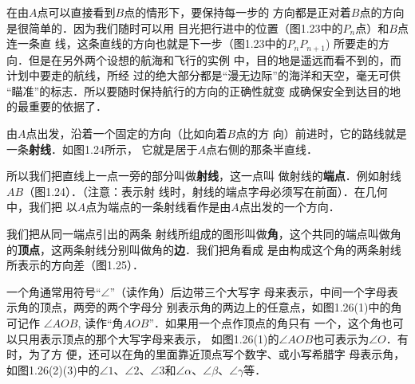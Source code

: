 在由$A$点可以直接看到$B$点的情形下，要保持每一步的
方向都是正对着$B$点的方向是很简单的．因为我们随时可以用
目光把行进中的位置（图1.23中的$P_n$点）和$B$点连一条直
线，这条直线的方向也就是下一步（图1.23中的$P_nP_{n+1}$)
所要走的方向．但是在另外两个设想的航海和飞行的实例
中，目的地是遥远而看不到的，而计划中要走的航线，所经
过的绝大部分都是“漫无边际”的海洋和天空，毫无可供
“瞄准”的标志．所以要随时保持航行的方向的正确性就变
成确保安全到达目的地的最重要的依据了．

由$A$点出发，沿着一个固定的方向（比如向着$B$点的方
向）前进时，它的路线就是一条\textbf{射线}．如图1.24所示，
它就是居于$A$点右侧的那条半直线．
\begin{figure}[htp]\centering
    \begin{minipage}[t]{0.48\textwidth}
    \centering
{}
    \caption{}
    \end{minipage}
    \begin{minipage}[t]{0.48\textwidth}
    \centering
    \caption{}
    \end{minipage}
    \end{figure}

所以我们把直线上一点一旁的部分叫做\textbf{射线}，这一点叫
做射线的\textbf{端点}．例如射线$AB$（图1.24）．（注意：表示射
线时，射线的端点字母必须写在前面）．在几何中，我们把
以$A$点为端点的一条射线看作是由$A$点出发的一个方向．

我们把从同一端点引出的两条
射线所组成的图形叫做\textbf{角}，这个共同的端点叫做角的\textbf{顶点}，这两条射线分别叫做角的\textbf{边}．我们把角看成
是由构成这个角的两条射线所表示的方向差（图1.25）．

一个角通常用符号“$\angle$”（读作角）后边带三个大写字
母来表示，中间一个字母表示角的顶点，两旁的两个字母分
别表示角的两边上的任意点，如图1.26(1)中的角可记作
$\angle AOB$, 读作“角$AOB$”．如果用一个点作顶点的角只有
一个，这个角也可以只用表示顶点的那个大写字母来表示，
如图1.26(1)的$\angle AOB$也可表示为$\angle O$．有时，为了方
便，还可以在角的里面靠近顶点写个数字、或小写希腊字
母表示角，如图1.26(2)(3)中的$\angle 1$、$\angle 2$、$\angle 3$和$\angle \alpha$、$\angle \beta$、$\angle \gamma$等．

